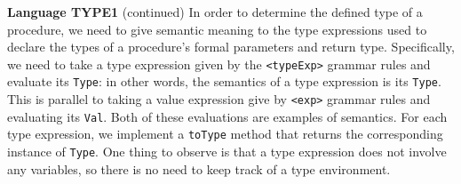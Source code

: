 \begin{minipage}[t]{\sw}
\slidenumber
\LARGE
{\bf Language TYPE1} (continued)\exx
In order to determine the defined type of a procedure,
we need to give semantic meaning to the type expressions
used to declare the types of a procedure's formal parameters
and return type.
Specifically, we need to take a type expression
given by the \verb'<typeExp>' grammar rules
and evaluate its \verb'Type':
in other words, the semantics of a type expression is its \verb'Type'.
This is parallel to taking a value expression
give by \verb'<exp>' grammar rules
and evaluating its \verb'Val'.
Both of these evaluations are examples of semantics.\exx
For each type expression, we implement a \verb'toType' method
that returns the corresponding instance of \verb'Type'.
One thing to observe is that a type expression
does not involve any variables,
so there is no need to keep track of a type environment.
\end{minipage}
